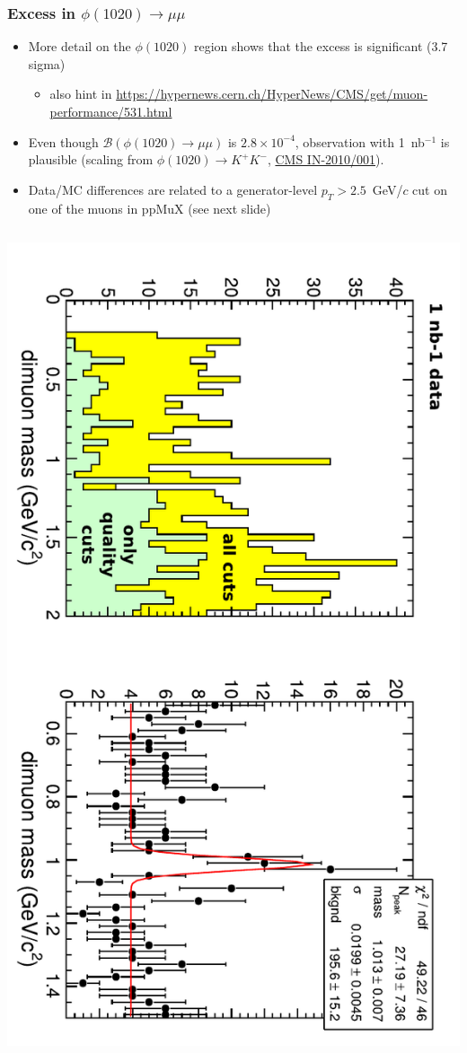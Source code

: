 \documentclass[compress]{beamer}
\begin{document}
\begin{frame}
\frametitle{Excess in $\phi(1020) \to \mu\mu$}

\begin{itemize}
\item More detail on the $\phi(1020)$ region shows that the excess is
  significant (3.7 sigma)
\begin{itemize}
\item also hint in \href{https://hypernews.cern.ch/HyperNews/CMS/get/muon-performance/531.html}{\scriptsize https://hypernews.cern.ch/HyperNews/CMS/get/muon-performance/531.html}
\end{itemize}

\item Even though $\mathcal{B}(\phi(1020) \to \mu\mu)$ is $2.8\times
  10^{-4}$, observation with 1~nb$^{-1}$ is plausible {\scriptsize (scaling from
  $\phi(1020) \to K^+K^-$, \href{http://cms.cern.ch/iCMS/jsp/db_notes/noteInfo.jsp?cmsnoteid=CMS IN-2010/001}{CMS IN-2010/001})}.
\item Data/MC differences are related to a generator-level $p_T > 2.5$~GeV/$c$ cut on one of the muons in ppMuX (see next slide)
\end{itemize}

\begin{columns}
\includegraphics[height=\linewidth, angle=90]{phi_to_mumu.pdf}


\end{columns}
\end{frame}
\end{document}
